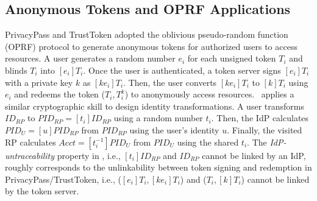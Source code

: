\subsection{Anonymous Tokens and OPRF Applications}
\label{sec:related}

\newc
PrivacyPass and TrustToken \cite{privacypass,trusttoken}
adopted the oblivious pseudo-random function (OPRF) protocol \cite{oprf-proved,voprf-proved,oprf-bitcoin-wallet} to generate anonymous tokens for authorized users to access resources.
 A user generates a random number $e_i$ for each unsigned token $T_i$ and blinds $T_i$ into $[e_i]T_i$.
Once the user is authenticated, a token server signs $[e_i]T_i$ with a private key $k$ as $[k e_i]T_i$. Then, the user converts $[ke_i]T_i$ to $[k]T_i$ using $e_i$ and redeems the token ($T_i, T_i^k$) to anonymously access resources.
\usso\ applies a similar cryptographic skill to design identity transformations. A user transforms $ID_{RP}$ to $PID_{RP} = [t_i]ID_{RP}$ using a random number $t_i$.
Then, the IdP calculates $PID_U = [u]PID_{RP}$ %
from $PID_{RP}$ using the user's identity $u$.
Finally, the visited RP calculates $Acct = [t_i^{-1}]PID_{U}$ from $PID_{U}$ using the shared $t_i$.
The \emph{IdP-untraceability} property in \usso, i.e., $[t_i]ID_{RP}$ and $ID_{RP}$ cannot be linked by an IdP, roughly corresponds to
the unlinkability between token signing and redemption in PrivacyPass/TrustToken, i.e., ($[e_i]T_i, [ke_i]T_i$) and  ($T_i, [k]T_i$) cannot be linked by the token server.


